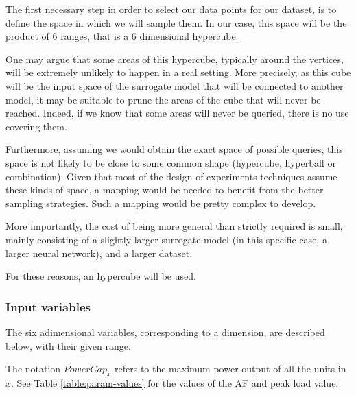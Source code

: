 The first necessary step in order to select our data points for our dataset, is to define the space in which we will sample them. In our case, this space will be the product of 6 ranges, that is a 6 dimensional hypercube. 

One may argue that some areas of this hypercube, typically around the vertices, will be extremely unlikely to happen in a real setting. More precisely, as this cube will be the input space of the surrogate model that will be connected to another model, it may be suitable to prune the areas of the cube that will never be reached. Indeed, if we know that some areas will never be queried, there is no use covering them.

Furthermore, assuming we would obtain the exact space of possible queries, this space is not likely to be close to some common shape (hypercube, hyperball or combination). Given that most of the design of experiments techniques assume these kinds of space, a mapping would be needed to benefit from the better sampling strategies. Such a mapping would be pretty complex to develop.

More importantly, the cost of being more general than strictly required is small, mainly consisting of a slightly larger surrogate model (in this specific case, a larger neural network), and a larger dataset.

For these reasons, an hypercube will be used.

\subsubsection{Input variables}

The six adimensional variables, corresponding to a dimension, are described below, with their given range.

The notation $PowerCap_{x}$ refers to the maximum power output of all the units in $x$. See Table \ref{table:param-values} for the values of the AF and peak load value.


